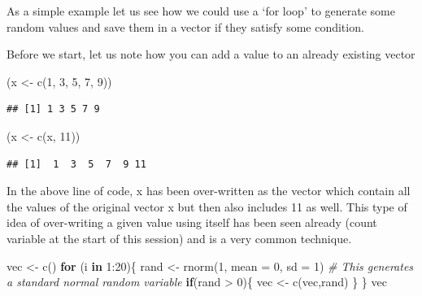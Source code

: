 \documentclass[
]{book}
\newenvironment{Shaded}{\begin{snugshade}}{\end{snugshade}}
\newcommand{\AttributeTok}[1]{\textcolor[rgb]{0.77,0.63,0.00}{#1}}
\newcommand{\CommentTok}[1]{\textcolor[rgb]{0.56,0.35,0.01}{\textit{#1}}}
\newcommand{\ControlFlowTok}[1]{\textcolor[rgb]{0.13,0.29,0.53}{\textbf{#1}}}
\newcommand{\DecValTok}[1]{\textcolor[rgb]{0.00,0.00,0.81}{#1}}
\newcommand{\FunctionTok}[1]{\textcolor[rgb]{0.00,0.00,0.00}{#1}}
\newcommand{\NormalTok}[1]{#1}
\newcommand{\OtherTok}[1]{\textcolor[rgb]{0.56,0.35,0.01}{#1}}
\newcommand{\SpecialCharTok}[1]{\textcolor[rgb]{0.00,0.00,0.00}{#1}}
\theoremstyle{definition}
\theoremstyle{definition}
\theoremstyle{definition}
\theoremstyle{definition}
\theoremstyle{remark}
\begin{document}
As a simple example let us see how we could use a `for loop' to generate some random values and save them in a vector if they satisfy some condition.

Before we start, let us note how you can add a value to an already existing vector

\begin{Shaded}
\begin{Highlighting}[]
\NormalTok{(x }\OtherTok{\textless{}{-}} \FunctionTok{c}\NormalTok{(}\DecValTok{1}\NormalTok{, }\DecValTok{3}\NormalTok{, }\DecValTok{5}\NormalTok{, }\DecValTok{7}\NormalTok{, }\DecValTok{9}\NormalTok{))}
\end{Highlighting}
\end{Shaded}

\begin{verbatim}
## [1] 1 3 5 7 9
\end{verbatim}

\begin{Shaded}
\begin{Highlighting}[]
\NormalTok{(x }\OtherTok{\textless{}{-}} \FunctionTok{c}\NormalTok{(x, }\DecValTok{11}\NormalTok{))}
\end{Highlighting}
\end{Shaded}

\begin{verbatim}
## [1]  1  3  5  7  9 11
\end{verbatim}

In the above line of code, x has been over-written as the vector which contain all the values of the original vector x but then also includes 11 as well. This type of idea of over-writing a given value using itself has been seen already (count variable at the start of this session) and is a very common technique.

\begin{Shaded}
\begin{Highlighting}[]
\NormalTok{vec }\OtherTok{\textless{}{-}} \FunctionTok{c}\NormalTok{()}
\ControlFlowTok{for}\NormalTok{ (i }\ControlFlowTok{in} \DecValTok{1}\SpecialCharTok{:}\DecValTok{20}\NormalTok{)\{}
\NormalTok{  rand }\OtherTok{\textless{}{-}} \FunctionTok{rnorm}\NormalTok{(}\DecValTok{1}\NormalTok{, }\AttributeTok{mean =} \DecValTok{0}\NormalTok{, }\AttributeTok{sd =} \DecValTok{1}\NormalTok{) }\CommentTok{\# This generates a standard normal random variable }
  \ControlFlowTok{if}\NormalTok{(rand }\SpecialCharTok{\textgreater{}} \DecValTok{0}\NormalTok{)\{}
\NormalTok{    vec }\OtherTok{\textless{}{-}} \FunctionTok{c}\NormalTok{(vec,rand)}
\NormalTok{  \}}
\NormalTok{\}}
\NormalTok{vec}
\end{Highlighting}
\end{Shaded}
\end{document}
